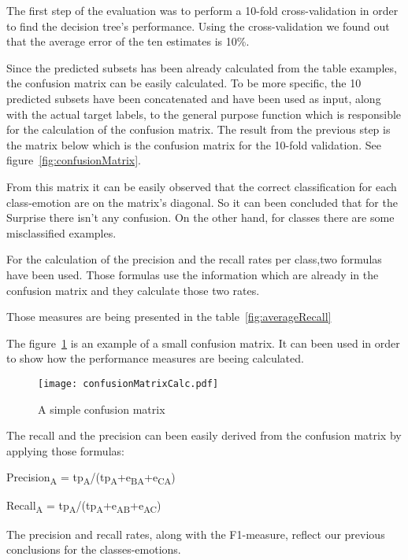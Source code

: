 The first step of the evaluation was to perform a 10-fold cross-validation in
order to find the decision tree's performance. Using the cross-validation we
found out that the average error of the ten estimates is 10\%. 

Since the predicted subsets has been already calculated from the table examples, the confusion matrix can be easily calculated. To be more specific, the 10 predicted subsets have been concatenated and have been used as input, along with the actual target labels, to the general purpose function which is responsible for the calculation of the confusion matrix.  
The result from the previous step is the matrix below which is the confusion matrix for the 10-fold validation.
See figure~\ref{fig:confusionMatrix}.


From this matrix it can be easily observed that the correct classification for each
class-emotion are on the matrix's diagonal. So it can been concluded that for the
Surprise there isn't any confusion. On the other hand, for classes there are some misclassified examples. 

For the calculation of the precision and the recall rates per class,two formulas have been used. Those formulas use the information which are already in the confusion matrix and they calculate those two rates.

Those measures are being presented in the table~\ref{fig:averageRecall}


The figure~\ref{fig:confisionMatixCalc} is an example of a small confusion matrix. It can been used in order to show how the performance measures are beeing calculated.

\begin{figure}[h]
    \centering
    \texttt{[image: confusionMatrixCalc.pdf]}
    \caption{A simple confusion matrix}
    \label{fig:confisionMatixCalc}
\end{figure}

The recall and the precision can been easily derived from the confusion matrix by applying those formulas:

Precision\textsubscript{A} = tp\textsubscript{A}/(tp\textsubscript{A}+e\textsubscript{BA}+e\textsubscript{CA})

Recall\textsubscript{A} = tp\textsubscript{A}/(tp\textsubscript{A}+e\textsubscript{AB}+e\textsubscript{AC})

The precision and recall rates, along with the F1-measure, reflect our previous conclusions for the classes-emotions.
